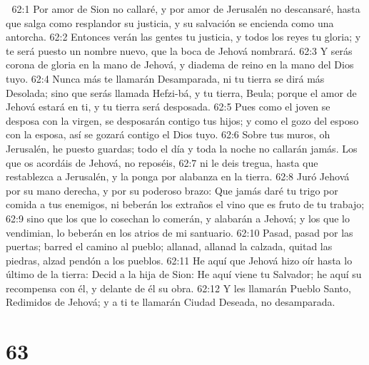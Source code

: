 
62:1 Por amor de Sion no callaré, y por amor de Jerusalén no descansaré, hasta que salga como resplandor su justicia, y su salvación se encienda como una antorcha.  
62:2 Entonces verán las gentes tu justicia, y todos los reyes tu gloria; y te será puesto un nombre nuevo, que la boca de Jehová nombrará.  
62:3 Y serás corona de gloria en la mano de Jehová, y diadema de reino en la mano del Dios tuyo.  
62:4 Nunca más te llamarán Desamparada, ni tu tierra se dirá más Desolada; sino que serás llamada Hefzi-bá, y tu tierra, Beula; porque el amor de Jehová estará en ti, y tu tierra será desposada.  
62:5 Pues como el joven se desposa con la virgen, se desposarán contigo tus hijos; y como el gozo del esposo con la esposa, así se gozará contigo el Dios tuyo.  
62:6 Sobre tus muros, oh Jerusalén, he puesto guardas; todo el día y toda la noche no callarán jamás. Los que os acordáis de Jehová, no reposéis,  
62:7 ni le deis tregua, hasta que restablezca a Jerusalén, y la ponga por alabanza en la tierra.  
62:8 Juró Jehová por su mano derecha, y por su poderoso brazo: Que jamás daré tu trigo por comida a tus enemigos, ni beberán los extraños el vino que es fruto de tu trabajo;  
62:9 sino que los que lo cosechan lo comerán, y alabarán a Jehová; y los que lo vendimian, lo beberán en los atrios de mi santuario.  
62:10 Pasad, pasad por las puertas; barred el camino al pueblo; allanad, allanad la calzada, quitad las piedras, alzad pendón a los pueblos.  
62:11 He aquí que Jehová hizo oír hasta lo último de la tierra: Decid a la hija de Sion: He aquí viene tu Salvador; he aquí su recompensa con él, y delante de él su obra. 
62:12 Y les llamarán Pueblo Santo, Redimidos de Jehová; y a ti te llamarán Ciudad Deseada, no desamparada.  

\chapter{63}

